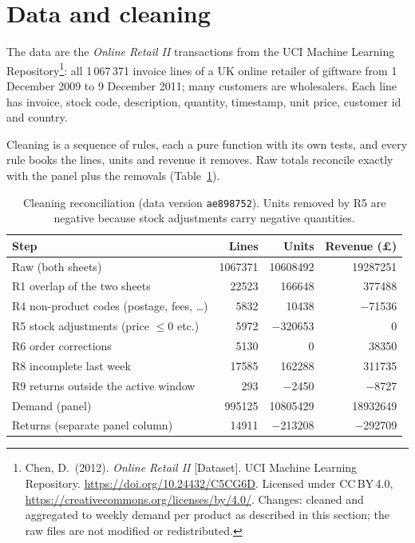 \documentclass[11pt,a4paper]{article}
\begin{document}
\section{Data and cleaning}
\label{sec:data}

The data are the \emph{Online Retail II} transactions from the UCI Machine Learning Repository\footnote{Chen, D.\ (2012). \emph{Online Retail II} [Dataset]. UCI Machine Learning Repository. \url{https://doi.org/10.24432/C5CG6D}. Licensed under CC\,BY\,4.0, \url{https://creativecommons.org/licenses/by/4.0/}. Changes: cleaned and aggregated to weekly demand per product as described in this section; the raw files are not modified or redistributed.}: all
1\,067\,371 invoice lines of a UK online retailer of giftware from 1 December 2009 to
9 December 2011; many customers are wholesalers. Each line has invoice, stock code,
description, quantity, timestamp, unit price, customer id and country.

Cleaning is a sequence of rules, each a pure function with its own tests, and every rule books
the lines, units and revenue it removes. Raw totals reconcile exactly with the panel plus the
removals (Table~\ref{tab:cleaning}).

\begin{table}[ht]
  \centering
  \small
  \caption{Cleaning reconciliation (data version \texttt{ae898752}). Units removed by R5 are
    negative because stock adjustments carry negative quantities.}
  \label{tab:cleaning}
  \begin{tabular}{lrrr}
    \toprule
    Step & Lines & Units & Revenue (£) \\
    \midrule
    Raw (both sheets) & \num{1067371} & \num{10608492} & \num{19287251} \\
    R1 overlap of the two sheets & \num{22523} & \num{166648} & \num{377488} \\
    R4 non-product codes (postage, fees, \dots) & \num{5832} & \num{10438} &
      \num{-71536} \\
    R5 stock adjustments (price $\le 0$ etc.) & \num{5972} &
      \num{-320653} & 0 \\
    R6 order corrections & \num{5130} & 0 & \num{38350} \\
    R8 incomplete last week & \num{17585} & \num{162288} & \num{311735} \\
    R9 returns outside the active window & 293 & \num{-2450} & \num{-8727} \\
    \midrule
    Demand (panel) & \num{995125} & \num{10805429} & \num{18932649} \\
    Returns (separate panel column) & \num{14911} & \num{-213208} & \num{-292709} \\
    \bottomrule
  \end{tabular}
\end{table}
\end{document}
